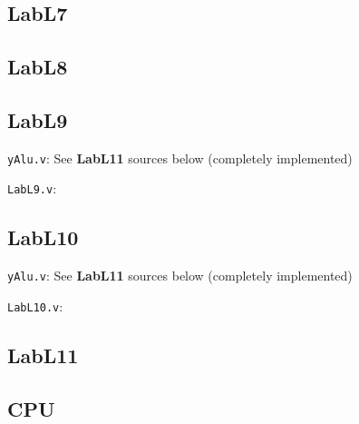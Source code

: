\documentclass{article}
\begin{document}
\subsection{LabL7}


\subsection{LabL8}



\subsection{LabL9}
\verb$yAlu.v$: See \textbf{LabL11} sources below (completely implemented)

\verb$LabL9.v$:


\subsection{LabL10}
\verb$yAlu.v$: See \textbf{LabL11} sources below (completely implemented)

\verb$LabL10.v$:


\subsection{LabL11}



\subsection{CPU}


\end{document}
